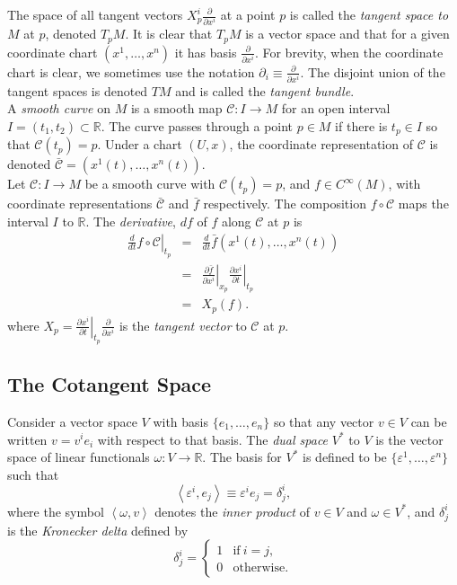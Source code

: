 The space of all tangent vectors $X^i_p  \frac{\partial}{\partial x^i}$ at a
point $p$ is called the \textit{tangent space to $M$} at $p$, denoted $T_p M$.
It is clear that $T_p M$ is a vector space and that for a given coordinate chart
$(x^1,\dots,x^n)$ it has basis $\frac{\partial}{\partial x^i}$. For brevity,
when the coordinate chart is clear, we sometimes use the notation
$\partial_i\equiv\frac{\partial}{\partial x^i}$. The disjoint union of the
tangent spaces is denoted $TM$ and is called the \textit{tangent bundle}.\\

A \textit{smooth curve} on $M$ is a smooth map $\mathcal{C}:I \rightarrow M$ for
an open interval $I=(t_1,t_2)\subset\mathbb{R}$. The curve passes through a
point $p\in M$ if there is $t_p \in I$ so that $\mathcal{C}(t_p)= p$. Under a
chart $(U,x)$, the coordinate representation of $\mathcal{C}$ is denoted
$\bar{\mathcal{C}}=(x^1(t),\dots,x^n(t))$.\\

Let $\mathcal{C}:I\rightarrow M$ be a smooth curve with $\mathcal{C}(t_p)=p$,
and $f\in C^{\infty}(M)$, with coordinate representations $\bar{\mathcal{C}}$
and $\bar{f}$ respectively. The composition $f\circ \mathcal{C}$ maps the
interval $I$ to $\mathbb{R}$. The \textit{derivative}, $df$ of $f$ along
$\mathcal{C}$ at $p$ is 
\begin{eqnarray}
\left. \frac{d}{dt}f\circ \mathcal{C}\right|_{t_p}&=&
\frac{d}{dt}\bar{f}(x^1(t),\dots,x^n(t))\nonumber \\
  &=& \left.\frac{\partial \bar{f}}{\partial x^i}\right|_{x_p}
\left.\frac{\partial x^i}{\partial t}\right|_{t_p} \nonumber \\
  &=& X_p(f). \label{eqn:devcurve}
\end{eqnarray}
where $X_p=\left.\frac{\partial x^i}{\partial
t}\right|_{t_p}\frac{\partial}{\partial x^i}$ is the \textit{tangent vector} to
$\mathcal{C}$ at $p$.

\subsection{The Cotangent Space}

Consider a vector space $V$ with basis $\{e_1,\dots,e_n\}$ so that any vector
$v\in V$ can be written $v=v^i e_i$ with respect to that basis. The \textit{dual
space} $V^*$ to $V$ is the vector space of linear functionals
$\omega:V\rightarrow\mathbb{R}$. The basis for $V^*$ is defined to be
$\{\varepsilon^1,\dots,\varepsilon^n\}$ such that
\[\left< \varepsilon^i, e_j \right> \equiv \varepsilon^i e_j = \delta^i_j ,\]
where the symbol $\left< \omega, v \right>$ denotes the \textit{inner product}
of $v\in V$ and $\omega\in V^*$, and $\delta^i_j$ is the \textit{Kronecker
delta} defined by
\[ \delta^i_j = \left\{ \begin{array}{ll}
										
	1 & \mbox{if}\  i=j,\\
										
	0 & \mbox{otherwise.} \end{array}\right. \]\\


